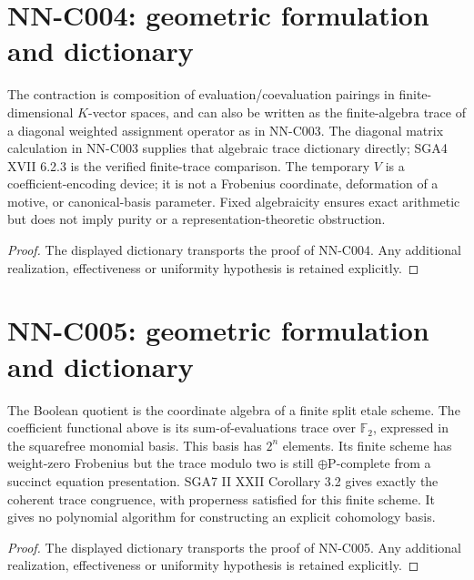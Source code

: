 \section{NN-C004: geometric formulation and dictionary}
\begin{geometricstatement}[NN-C004]
The contraction is composition of evaluation/coevaluation pairings in finite-dimensional $K$-vector spaces, and can also be written as the finite-algebra trace of a diagonal weighted assignment operator as in NN-C003. The diagonal matrix calculation in NN-C003 supplies that algebraic trace dictionary directly; SGA4 XVII 6.2.3 is the verified finite-trace comparison. The temporary $V$ is a coefficient-encoding device; it is not a Frobenius coordinate, deformation of a motive, or canonical-basis parameter. Fixed algebraicity ensures exact arithmetic but does not imply purity or a representation-theoretic obstruction.
\end{geometricstatement}
\begin{proof} The displayed dictionary transports the proof of NN-C004. Any additional realization, effectiveness or uniformity hypothesis is retained explicitly.\end{proof}


\section{NN-C005: geometric formulation and dictionary}
\begin{geometricstatement}[NN-C005]
The Boolean quotient is the coordinate algebra of a finite split etale scheme. The coefficient functional above is its sum-of-evaluations trace over $\mathbb F_2$, expressed in the squarefree monomial basis. This basis has $2^n$ elements. Its finite scheme has weight-zero Frobenius but the trace modulo two is still $\oplus\mathrm P$-complete from a succinct equation presentation. SGA7 II XXII Corollary 3.2 gives exactly the coherent trace congruence, with properness satisfied for this finite scheme. It gives no polynomial algorithm for constructing an explicit cohomology basis.
\end{geometricstatement}
\begin{proof} The displayed dictionary transports the proof of NN-C005. Any additional realization, effectiveness or uniformity hypothesis is retained explicitly.\end{proof}


